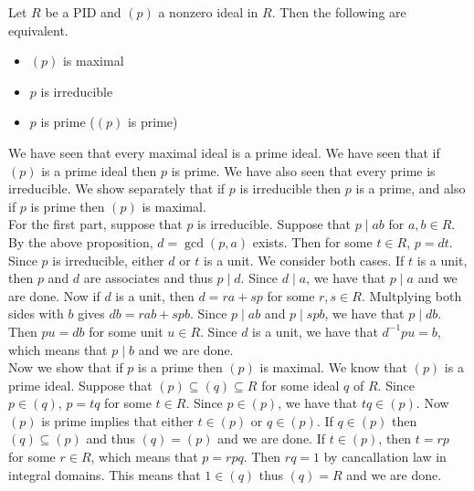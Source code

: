 \documentclass[a4paper]{article}
\begin{document}
\begin{prp}{}{} Let $R$ be a PID and $(p)$ a nonzero ideal in $R$. Then the following are equivalent. 
\begin{itemize}
\item $(p)$ is maximal
\item $p$ is irreducible
\item $p$ is prime ($(p)$ is prime)
\end{itemize} 
We have seen that every maximal ideal is a prime ideal. We have seen that if $(p)$ is a prime ideal then $p$ is prime. We have also seen that every prime is irreducible. We show separately that if $p$ is irreducible then $p$ is a prime, and also if $p$ is prime then $(p)$ is maximal. \\
For the first part, suppose that $p$ is irreducible. Suppose that $p\;|\;ab$ for $a,b\in R$. By the above proposition, $d=\gcd(p,a)$ exists. Then for some $t\in R$, $p=dt$. Since $p$ is irreducible, either $d$ or $t$ is a unit. We consider both cases. If $t$ is a unit, then $p$ and $d$ are associates and thus $p\;|\;d$. Since $d\;|\;a$, we have that $p\;|\;a$ and we are done. Now if $d$ is a unit, then $d=ra+sp$ for some $r,s\in R$. Multplying both sides with $b$ gives $db=rab+spb$. Since $p\;|\;ab$ and $p\;|\;spb$, we have that $p\;|\;db$. Then $pu=db$ for some unit $u\in R$. Since $d$ is a unit, we have that $d^{-1}pu=b$, which means that $p\;|\;b$ and we are done. \\
Now we show that if $p$ is a prime then $(p)$ is maximal. We know that $(p)$ is a prime ideal. Suppose that $(p)\subseteq(q)\subseteq R$ for some ideal $q$ of $R$. Since $p\in(q)$, $p=tq$ for some $t\in R$. Since $p\in(p)$, we have that $tq\in(p)$. Now $(p)$ is prime implies that either $t\in(p)$ or $q\in(p)$. If $q\in(p)$ then $(q)\subseteq(p)$ and thus $(q)=(p)$ and we are done. If $t\in(p)$, then $t=rp$ for some $r\in R$, which means that $p=rpq$. Then $rq=1$ by cancallation law in integral domains. This means that $1\in(q)$ thus $(q)=R$ and we are done. 
\end{prp}
\end{document}
